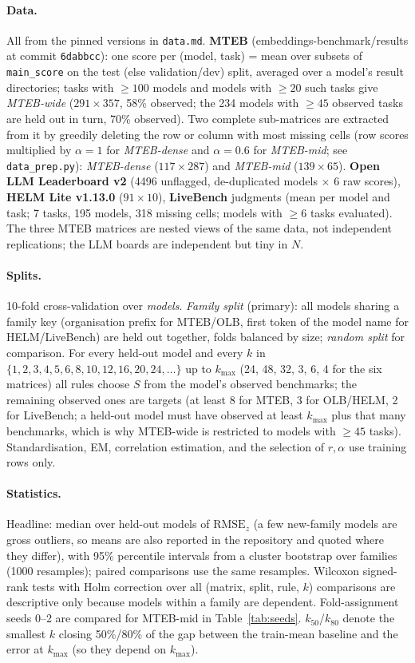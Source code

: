 \documentclass{article}
\newcommand{\rmse}{\mathrm{RMSE}_z}
\begin{document}
\paragraph{Data.} All from the pinned versions in \texttt{data.md}. \textbf{MTEB} (embeddings-benchmark/results at commit \texttt{6dabbcc}): one score per (model, task) = mean over subsets of \texttt{main\_score} on the test (else validation/dev) split, averaged over a model's result directories; tasks with $\ge100$ models and models with $\ge20$ such tasks give \emph{MTEB-wide} ($291\times357$, 58\% observed; the 234 models with $\ge45$ observed tasks are held out in turn, 70\% observed). Two complete sub-matrices are extracted from it by greedily deleting the row or column with most missing cells (row scores multiplied by $\alpha=1$ for \emph{MTEB-dense} and $\alpha=0.6$ for \emph{MTEB-mid}; see \texttt{data\_prep.py}): \emph{MTEB-dense} ($117\times287$) and \emph{MTEB-mid} ($139\times65$). \textbf{Open LLM Leaderboard v2} (4496 unflagged, de-duplicated models $\times$ 6 raw scores), \textbf{HELM Lite v1.13.0} ($91\times10$), \textbf{LiveBench} judgments (mean per model and task; 7 tasks, 195 models, 318 missing cells; models with $\ge6$ tasks evaluated). The three MTEB matrices are nested views of the same data, not independent replications; the LLM boards are independent but tiny in $N$.
\paragraph{Splits.} 10-fold cross-validation over \emph{models}. \emph{Family split} (primary): all models sharing a family key (organisation prefix for MTEB/OLB, first token of the model name for HELM/LiveBench) are held out together, folds balanced by size; \emph{random split} for comparison. For every held-out model and every $k$ in $\{1,2,3,4,5,6,8,10,12,16,20,24,\dots\}$ up to $k_{\max}$ (24, 48, 32, 3, 6, 4 for the six matrices) all rules choose $S$ from the model's observed benchmarks; the remaining observed ones are targets (at least 8 for MTEB, 3 for OLB/HELM, 2 for LiveBench; a held-out model must have observed at least $k_{\max}$ plus that many benchmarks, which is why MTEB-wide is restricted to models with $\ge45$ tasks). Standardisation, EM, correlation estimation, and the selection of $r,\alpha$ use training rows only.
\paragraph{Statistics.} Headline: median over held-out models of $\rmse$ (a few new-family models are gross outliers, so means are also reported in the repository and quoted where they differ), with 95\% percentile intervals from a cluster bootstrap over families (1000 resamples); paired comparisons use the same resamples. Wilcoxon signed-rank tests with Holm correction over all (matrix, split, rule, $k$) comparisons are descriptive only because models within a family are dependent. Fold-assignment seeds 0--2 are compared for MTEB-mid in Table~\ref{tab:seeds}. $k_{50}$/$k_{80}$ denote the smallest $k$ closing 50\%/80\% of the gap between the train-mean baseline and the error at $k_{\max}$ (so they depend on $k_{\max}$).
\end{document}
